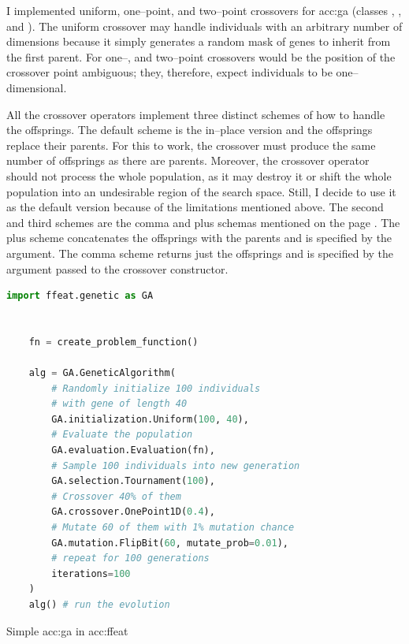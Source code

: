 I implemented uniform, one--point, and two--point crossovers for \acrshort{acc:ga} (classes , , and ). The uniform crossover may handle individuals with an arbitrary number of dimensions because it simply generates a random mask of genes to inherit from the first parent. For one--, and two--point crossovers would be the position of the crossover point ambiguous; they, therefore, expect individuals to be one--dimensional.

All the crossover operators implement three distinct schemes of how to handle the offsprings. The default scheme is the in--place version and the offsprings replace their parents. For this to work, the crossover must produce the same number of offsprings as there are parents. Moreover, the crossover operator should not process the whole population, as it may destroy it or shift the whole population into an undesirable region of the search space. Still, I decide to use it as the default version because of the \gpu limitations mentioned above.
The second and third schemes are the comma and plus schemas mentioned on the page \pageref{enum:steadystate}. The plus scheme concatenates the offsprings with the parents and is specified by the  argument. The comma scheme returns just the offsprings and is specified by the  argument passed to the crossover constructor.

\begin{algorithm}[b!]
    \begin{lstlisting}[language=Python, xrightmargin=18pt]
    import ffeat.genetic as GA
    
    
    fn = create_problem_function()
    
    alg = GA.GeneticAlgorithm(
        # Randomly initialize 100 individuals 
        # with gene of length 40
        GA.initialization.Uniform(100, 40),
        # Evaluate the population
        GA.evaluation.Evaluation(fn),
        # Sample 100 individuals into new generation
        GA.selection.Tournament(100),
        # Crossover 40% of them
        GA.crossover.OnePoint1D(0.4),
        # Mutate 60 of them with 1% mutation chance
        GA.mutation.FlipBit(60, mutate_prob=0.01),
        # repeat for 100 generations
        iterations=100
    )
    alg() # run the evolution
    \end{lstlisting}
    \caption{Simple \acrshort*{acc:ga} in \acrshort*{acc:ffeat}}
    \label{alg:gaffeat}
    \end{algorithm}

